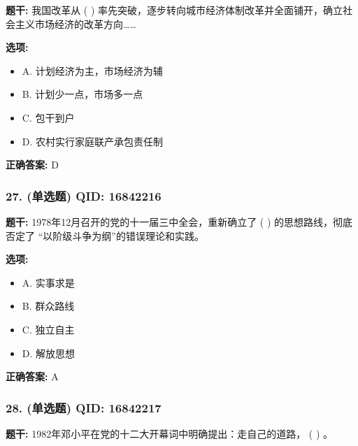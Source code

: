 \documentclass[12pt,UTF8]{ctexart}
\begin{document}
\textbf{题干:}
我国改革从 ( ) 率先突破，逐步转向城市经济体制改革并全面铺开，确立社会主义市场经济的改革方向……

\textbf{选项:}
\begin{itemize}[leftmargin=*]

  \item A. 计划经济为主，市场经济为辅

  \item B. 计划少一点，市场多一点

  \item C. 包干到户

  \item D. 农村实行家庭联产承包责任制

\end{itemize}

\textbf{正确答案:}
D

\vspace{0.3em}\hrulefill\vspace{0.7em}

\subsubsection*{27. (单选题) \small QID: 16842216}

\textbf{题干:}
1978年12月召开的党的十一届三中全会，重新确立了 ( ) 的思想路线，彻底否定了 “以阶级斗争为纲”的错误理论和实践。

\textbf{选项:}
\begin{itemize}[leftmargin=*]

  \item A. 实事求是

  \item B. 群众路线

  \item C. 独立自主

  \item D. 解放思想

\end{itemize}

\textbf{正确答案:}
A

\vspace{0.3em}\hrulefill\vspace{0.7em}

\subsubsection*{28. (单选题) \small QID: 16842217}

\textbf{题干:}
1982年邓小平在党的十二大开幕词中明确提出：走自己的道路， ( ) 。
\end{document}
